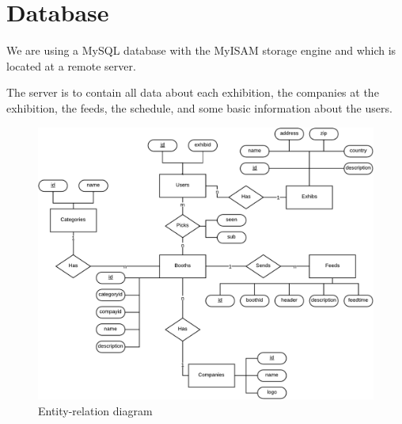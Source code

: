 \section{Database}
We are using a MySQL database with the MyISAM storage engine and which is located at a remote server. 

The server is to contain all data about each exhibition, the companies at the exhibition, the feeds, the schedule, and some basic information about the users.

\begin{figure}[H]
\centering
\includegraphics[page=1,width=1\linewidth]{img/sw7ERD.pdf}
\caption{Entity-relation diagram}
\label{fig:erd}
\end{figure}

